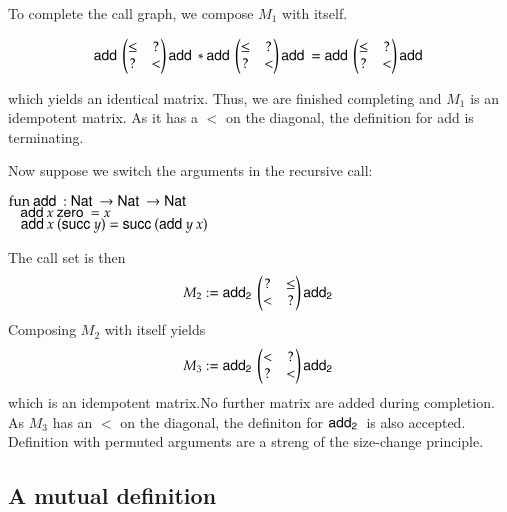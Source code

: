 To complete the call graph, we compose $M_1$ with itself.

\[
\mathsf{add}\:\begin{pmatrix}
\leq & ? \\
?    & < \\
\end{pmatrix}\mathsf{add}\:
* 
\mathsf{add}\:\begin{pmatrix}
\leq & ? \\
?    & < \\
\end{pmatrix}\mathsf{add}\:
=
\mathsf{add}\:\begin{pmatrix}
\leq & ? \\
?    & < \\
\end{pmatrix}\mathsf{add}\:
\]

which yields an identical matrix.
Thus, we are finished completing and $M_1$ is an idempotent matrix.
As it has a $<$ on the diagonal, the definition for add is terminating.

Now suppose we switch the arguments in the recursive call:
\begin{bsp}
$\mathrm{fun}\: \mathsf{add}\: : \mathsf{Nat}\: \rightarrow \mathsf{Nat}\: \rightarrow \mathsf{Nat}\:$\\
$\hspace*{3mm} \mathsf{add}\: x \: \mathsf{zero}\: = x $\\
$\hspace*{3mm} \mathsf{add}\: x \: (\mathsf{succ}\: y) = \mathsf{succ}\: (\mathsf{add}\: y \: x)  $
\end{bsp}

The call set is then 
\[
M_2 := \mathsf{add_2}\:\begin{pmatrix}

? & \leq \\
< & ?   \\
\end{pmatrix}\mathsf{add_2}\:
\]
Composing $M_2$ with itself yields
\[
M_3 := \mathsf{add_2}\: \begin{pmatrix}
< & ?    \\
? & <    \\
\end{pmatrix} \mathsf{add_2}\:
\] 
which is an idempotent matrix.No further matrix are added during completion.
As $M_3$ has an $<$ on the diagonal, the definiton for $\mathsf{add_2}\:$ is also accepted.
Definition with permuted arguments are a streng of the size-change principle.  

\subsection{A mutual definition}

